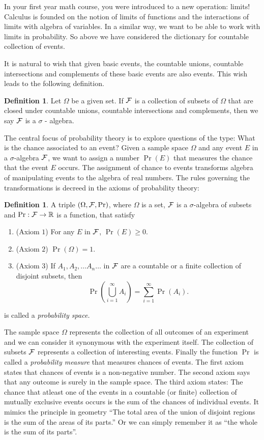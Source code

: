 \documentclass[letterpaper, 12pt]{article}
\newcommand{\1}{\mathds{1}} %
\theoremstyle{definition}
\newtheorem{definition}[theorem]{Definition}
\begin{document}
In your first year math course, you were introduced to a new operation: limits! Calculus is founded on the notion of limits of functions and the interactions of limits with algebra of variables. In a similar way, we want to be able to work with limits in probability. So above we have considered the dictionary for countable collection of events. 

It is natural to wish that given basic events, the countable unions, countable intersections and complements of these basic events are also events. This wish leads to the following definition.

\begin{definition}
   Let $\Omega$ be a given set. If $\cal F$ is a collection of subsets of $\Omega$ that are closed under countable unions, countable intersections and complements, then we say $\cal F$ is a $\sigma$ - algebra.
 \end{definition}

The central focus of probability theory is to explore questions of the type: What is the chance associated to an event?
Given a sample space $\Omega$ and any event $E$ in a $\sigma$-algebra $\cal F$, we want to assign a number $\Pr(E)$ that measures the chance that the event $E$ occurs. The assignment of chance to events transforms algebra of manipulating events to the algebra of real numbers. The rules governing the transformations is decreed in the axioms of probability theory:

\begin{definition}
\label{axiom:kolm}
A triple $(\Omega,{\cal F}, \Pr)$, where $\Omega$ is a set, $\cal F$ is a $\sigma$-algebra of subsets and $\Pr:{\cal F} \to \mathbb{R}$ is a function, that satisfy
\begin{enumerate}
\item (Axiom $1$) For any $E$ in $\cal F$, $\Pr(E) \geq 0$.
\item (Axiom $2$)  $\Pr(\Omega) = 1$.
\item (Axiom $3$)  If $A_1,A_2,\ldots A_n\ldots$ in $\cal F$ are a countable or a finite collection of disjoint subsets, then \[\displaystyle \Pr\left(\bigcup_{i=1}^{\infty} A_i\right) = \sum_{i=1}^{\infty} \Pr(A_i).\]
\end{enumerate}
 is called a \textit{probability space.}
\end{definition}

The sample space $\Omega$ represents the collection of all outcomes of an experiment and we can consider it synonymous with the experiment itself. The collection of subsets $\cal F$ represents a collection of interesting events. Finally the function $\Pr$ is called a \emph{probability measure} that measures chances of events. The first axiom states that chances of events is a non-negative number. The second axiom says that any outcome is surely in the sample space. The third axiom states: The chance that atleast one of the events in a countable (or finite) collection of mutually exclusive events occurs is the sum of the chances of individual events. It mimics the principle in geometry ``The total area of the union of disjoint regions is the sum of the areas of its parts.'' Or we can simply remember it as ``the whole is the sum of its parts''.
\end{document}
